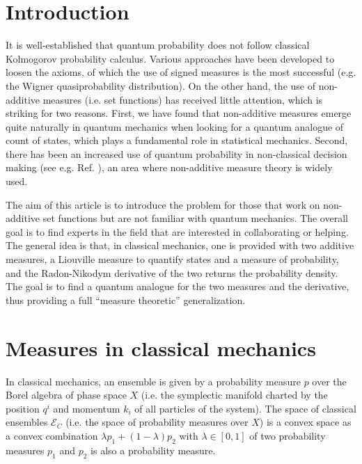 \documentclass{styles/svproc}
\begin{document}
\section{Introduction}
%
It is well-established that quantum probability does not follow classical Kolmogorov probability calculus. Various approaches have been developed to loosen the axioms, of which the use of signed measures is the most successful (e.g. the Wigner quasiprobability distribution).\cite{gleason1957measures,groenewold1946principles,gudder2009quantum,hamhalter2003quantum,monchietti2023measure,moyal1949quantum,sorkin1994quantum,svozil2022extending} On the other hand, the use of non-additive measures (i.e. set functions) has received little attention, which is striking for two reasons. First, we have found that non-additive measures emerge quite naturally in quantum mechanics when looking for a quantum analogue of count of states\cite{aop-phys-QuantumRequiresNonAdditiveMeasures}, which plays a fundamental role in statistical mechanics. Second, there has been an increased use of quantum probability in non-classical decision making (see e.g. Ref. \cite{quantumrev2023}), an area where non-additive measure theory is widely used.

The aim of this article is to introduce the problem for those that work on non-additive set functions but are not familiar with quantum mechanics. The overall goal is to find experts in the field that are interested in collaborating or helping. The general idea is that, in classical mechanics, one is provided with two additive measures, a Liouville measure to quantify states and a measure of probability, and the Radon-Nikodym derivative of the two returns the probability density. The goal is to find a quantum analogue for the two measures and the derivative, thus providing a full ``measure theoretic'' generalization.

\section{Measures in classical mechanics}

In classical mechanics, an ensemble is given by a probability measure $p$ over the Borel algebra of phase space $X$ (i.e. the symplectic manifold charted by the position $q^i$ and momentum $k_i$ of all particles of the system). The space of classical ensembles $\mathcal{E}_C$ (i.e. the space of probability measures over $X$) is a convex space as a convex combination $\lambda p_1 + (1 - \lambda) p_2$ with $\lambda \in [0,1]$ of two probability measures $p_1$ and $p_2$ is also a probability measure.
\end{document}
